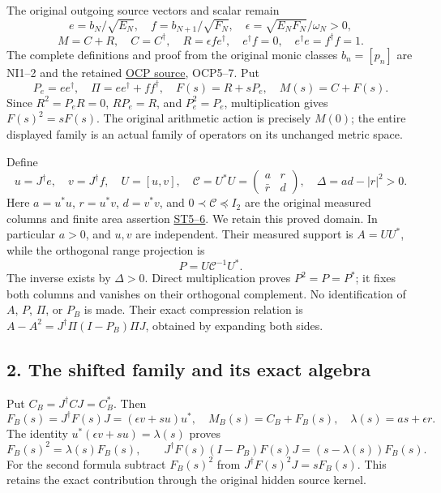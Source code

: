 \documentclass[
]{article}
\begin{document}
The original outgoing source vectors and scalar remain \[
e=b_N/\sqrt{E_N},\quad f=b_{N+1}/\sqrt{F_N},\quad
\epsilon=\sqrt{E_NF_N}/\omega_N>0,
\] \[
M=C+R,\quad C=C^\dagger,\quad R=\epsilon f e^\dagger,
\quad e^\dagger f=0,\quad e^\dagger e=f^\dagger f=1.
\tag{OC2}
\] The complete definitions and proof from the original monic classes
\(b_n=[p_n]\) are NI1--2 and the retained
\href{https://github.com/KokunoYumeto/zeta-function-research-reader/blob/c9df443d9e1df000dfbb083943f97197e746eb08/workbenches/splitzero-tandem/branches/identity-absorber-square/sources/OBSERVED_CURRENT_PLANE.tex}{OCP
source}, OCP5--7. Put \[
P_e=ee^\dagger,\quad \Pi=ee^\dagger+ff^\dagger,\quad
F(s)=R+sP_e,\quad M(s)=C+F(s).
\] Since \(R^2=P_eR=0\), \(RP_e=R\), and \(P_e^2=P_e\), multiplication
gives \(F(s)^2=sF(s)\). The original arithmetic action is precisely
\(M(0)\); the entire displayed family is an actual family of operators
on its unchanged metric space.

Define \[
u=J^\dagger e,\quad v=J^\dagger f,\quad U=[u,v],\quad
\mathcal C=U^*U=\begin{pmatrix}a&r\\\bar r&d\end{pmatrix},
\quad \Delta=ad-|r|^2>0.
\tag{OC3}
\] Here \(a=u^*u\), \(r=u^*v\), \(d=v^*v\), and
\(0\prec\mathcal C\preceq I_2\) are the original measured columns and
finite area assertion
\href{https://github.com/KokunoYumeto/zeta-function-research-reader/blob/4ba9285b66af58a6d58fc502a494c1fb45ca5b79/workbenches/splitzero-tandem/continuations/20260922-support-transport/SUPPORT_SPECTRUM_AND_TERMINAL_MASS.md\#L44}{ST5--6}.
We retain this proved domain. In particular \(a>0\), and \(u,v\) are
independent. Their measured support is \(A=UU^*\), while the orthogonal
range projection is \[
P=U\mathcal C^{-1}U^*.
\tag{OC4}
\] The inverse exists by \(\Delta>0\). Direct multiplication proves
\(P^2=P=P^*\); it fixes both columns and vanishes on their orthogonal
complement. No identification of \(A\), \(P\), \(\Pi\), or \(P_B\) is
made. Their exact compression relation is
\(A-A^2=J^\dagger\Pi(I-P_B)\Pi J\), obtained by expanding both sides.

\subsection{2. The shifted family and its exact
algebra}\label{the-shifted-family-and-its-exact-algebra}

Put \(C_B=J^\dagger CJ=C_B^*\). Then \[
F_B(s)=J^\dagger F(s)J=(\epsilon v+su)u^*,\quad
M_B(s)=C_B+F_B(s),\quad \lambda(s)=as+\epsilon r.
\tag{OC5}
\] The identity \(u^*(\epsilon v+su)=\lambda(s)\) proves \[
F_B(s)^2=\lambda(s)F_B(s),\qquad
J^\dagger F(s)(I-P_B)F(s)J=(s-\lambda(s))F_B(s).
\tag{OC6}
\] For the second formula subtract \(F_B(s)^2\) from
\(J^\dagger F(s)^2J=sF_B(s)\). This retains the exact contribution
through the original hidden source kernel.
\end{document}
